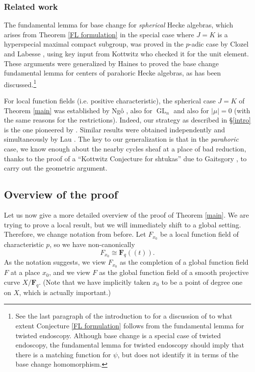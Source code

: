 \documentclass[reqno]{amsart}
\numberwithin{equation}{section}
\newcommand{\F}{\mathbf{F}}
\DeclareMathOperator{\GL}{GL}
\theoremstyle{remark}
\newtheorem{remark}[thm]{Remark}
\numberwithin{equation}{section}
\begin{document}
\subsubsection{Related work} The fundamental lemma for base change for \emph{spherical} Hecke algebras, which arises from Theorem \ref{FL formulation} in the special case where $J= K$ is a hyperspecial maximal compact subgroup, was proved in the $p$-adic case by Clozel \cite{Clo90} and Labesse \cite{Lab90}, using key input from Kottwitz \cite{Kott86b} who checked it for the unit element. These arguments were generalized by Haines to proved the base change fundamental lemma for centers of parahoric Hecke algebras, as has been discussed.\footnote{See the last paragraph of the introduction to \cite{Haines09} for a discussion of to what extent Conjecture \ref{FL formulation} follows from the fundamental lemma for twisted endoscopy. Although base change is a special case of twisted endoscopy, the fundamental lemma for twisted endoscopy should imply that there is a matching function for $\psi$, but does not identify it in terms of the base change homomorphism.}


For local function fields (i.e. positive characteristic), the spherical case $J=K$ of Theorem \ref{main} was established by Ng\^{o} \cite{Ngo06}, also for $\GL_n$ and also for $|\mu|=0$ (with the same reasons for the restrictions). Indeed, our  strategy as described in \S \ref{intro} is the one pioneered by \cite{Ngo06}. Similar results were obtained independently and simultaneously by Lau \cite{Lau04}. The key to our generalization is that in the \emph{parahoric} case, we know enough about the nearby cycles sheaf at a place of bad reduction, thanks to the proof of a ``Kottwitz Conjecture for shtukas'' due to Gaitsgory \cite{Gaits01}, to carry out the geometric argument. 


\subsection{Overview of the proof}\label{overview}


Let us now give a more detailed overview of the proof of Theorem \ref{main}. We are trying to prove a local result, but we will immediately shift to a global setting. Therefore, we change notation from before. Let $F_{x_0}$ be a local function field of characteristic $p$, so we have non-canonically 
\[
F_{x_0} \cong \F_q((t)).
\]
As the notation suggests, we view  $F_{x_0}$ as the completion of a global function field $F$ at a place $x_0$, and we view $F$ as the global function field of a smooth projective curve $X/\F_q$. (Note that we have implicitly taken $x_0$  to be a point of  degree one on $X$, which is actually important.)
\end{document}
